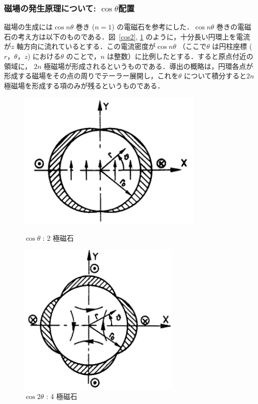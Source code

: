 \subsubsection{磁場の発生原理について: $\cos \theta$配置}
磁場の生成には$\cos n \theta$ 巻き ($n=1$) の電磁石を参考にした．$\cos n \theta$ 巻きの電磁石の考え方は以下のものである．図~\ref{cos2}, \ref{cos4} のように，十分長い円環上を電流が$z$ 軸方向に流れているとする．この電流密度が$\cos n\theta$ （ここで$\theta$ は円柱座標 ($r，\theta，z$) における$\theta$ のことで，$n$ は整数）に比例したとする．すると原点付近の領域に， $2n$ 極磁場が形成されるというものである．導出の概略は，円環各点が形成する磁場をその点の周りでテーラー展開し，これを$\theta$ について積分すると$2n$ 極磁場を形成する項のみが残るというものである．\cite{mag}

\begin{figure}[H]
\begin{minipage}{0.45\hsize}
\centering
\includegraphics[width=0.8\textwidth]{figure/tajima/cos.png}
\caption{$\cos\theta$ : 2 極磁石\cite{magnet}}
\label{cos2}
\end{minipage}
\hfill
\begin{minipage}{0.45\hsize}
\centering
\includegraphics[width=0.7\textwidth]{figure/tajima/cos2.png}
\caption{$\cos 2 \theta$ : 4 極磁石\cite{magnet}}
\label{cos4}
\end{minipage}
\end{figure}

